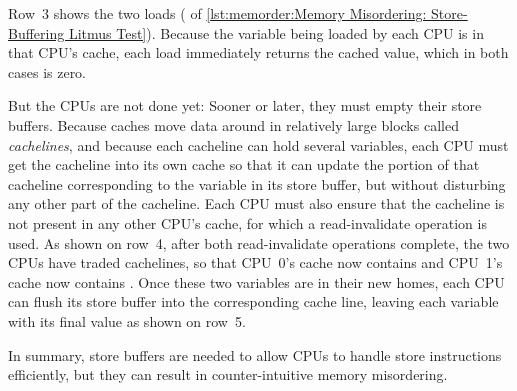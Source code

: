 \QuickQuizEnd

\begin{fcvref}
Row~3 shows the two loads ( of
\cref{lst:memorder:Memory Misordering: Store-Buffering Litmus Test}).
Because the variable being loaded by each CPU is in that CPU's cache,
each load immediately returns the cached value, which in both cases
is zero.
\end{fcvref}

But the CPUs are not done yet: Sooner or later, they must empty their
store buffers.
Because caches move data around in relatively large blocks called
\emph{cachelines}, and because each cacheline can hold several
variables, each CPU must get the cacheline into its own cache so
that it can update the portion of that cacheline corresponding
to the variable in its store buffer, but without disturbing any
other part of the cacheline.
Each CPU must also ensure that the cacheline is not present in any other
CPU's cache, for which a read-invalidate operation is used.
As shown on row~4, after both read-invalidate operations complete,
the two CPUs have traded cachelines, so that CPU~0's cache now contains
 and CPU~1's cache now contains .
Once these two variables are in their new homes, each CPU can flush
its store buffer into the corresponding cache line, leaving each
variable with its final value as shown on row~5.

\QuickQuizEnd

In summary, store buffers are needed to allow CPUs to handle
store instructions efficiently, but they can result in
counter-intuitive memory misordering.


